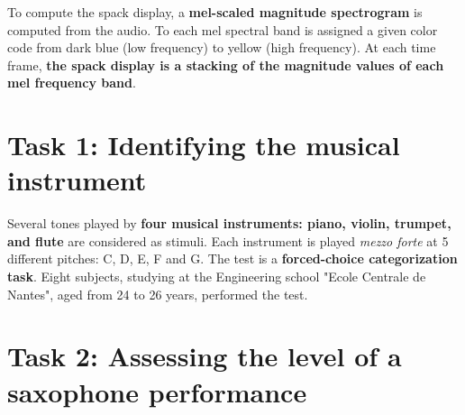 \documentclass[a0,portrait,15pt]{a0poster}
\begin{document}
\begin{multicols}{2}
To compute the spack display, a \textbf{mel-scaled magnitude spectrogram} is computed from the audio. To each mel spectral band is assigned a given color code from dark blue (low frequency) to yellow (high frequency). At each time frame, \textbf{the spack display is a stacking of the magnitude values of each mel frequency band}.

\begin{center}\vspace{1cm}
\end{center}\vspace{1cm}

\section*{Task 1: Identifying the musical instrument}

Several tones played by \textbf{four musical instruments: piano, violin, trumpet, and flute} are considered as stimuli. Each instrument is played \textit{mezzo forte} at 5 different pitches: C, D, E, F and G. The test is a \textbf{forced-choice categorization task}. Eight subjects, studying at the Engineering school "Ecole Centrale de Nantes", aged from 24 to 26 years, performed the test.

\section*{Task 2: Assessing the level of a saxophone performance}

\begin{center}
\end{center}\vspace{1cm}


\end{multicols}
\end{document}
